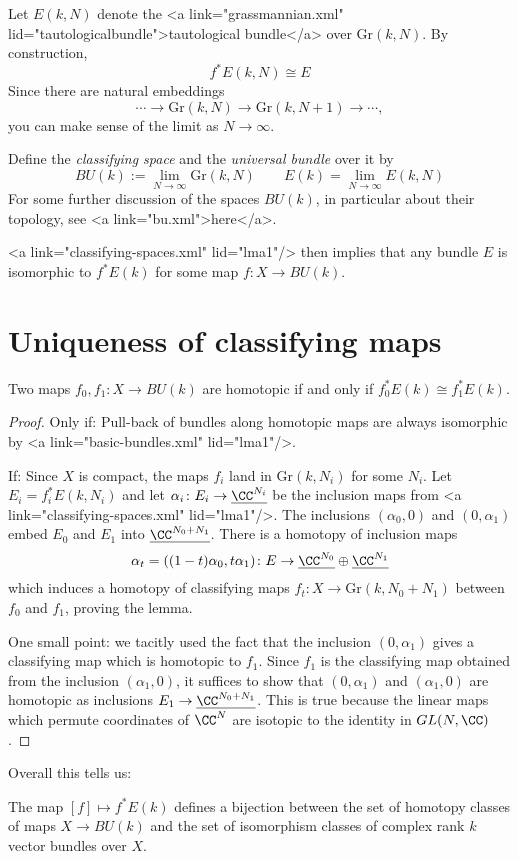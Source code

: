 Let $E(k,N)$ denote the <a link="grassmannian.xml" lid="tautologicalbundle">tautological bundle</a> over $\mathrm{Gr}(k,N)$. By construction,
\[f^*E(k,N)\cong E\]
Since there are natural embeddings
\[\cdots\to\mathrm{Gr}(k,N)\to\mathrm{Gr}(k,N+1)\to\cdots,\]
you can make sense of the limit as $N\to\infty$.
\begin{Definition}[dfn2]
Define the {\em classifying space} and the {\em universal bundle} over it by
\[BU(k):=\lim_{N\to\infty}\mathrm{Gr}(k,N)\qquad E(k)=\lim_{N\to\infty}E(k,N)\]
For some further discussion of the spaces $BU(k)$, in particular about their topology, see <a link="bu.xml">here</a>.
\end{Definition}
<a link="classifying-spaces.xml" lid="lma1"/> then implies that any bundle $E$ is isomorphic to $f^*E(k)$ for some map $f\colon X\to BU(k)$.

\section{Uniqueness of classifying maps}

\begin{Lemma}[lma2]
Two maps $f_0,f_1\colon X\to BU(k)$ are homotopic if and only if $f_0^*E(k)\cong f_1^*E(k)$.
\end{Lemma}
\begin{proof}
Only if: Pull-back of bundles along homotopic maps are always isomorphic by <a link="basic-bundles.xml" lid="lma1"/>.
 
If: Since $X$ is compact, the maps $f_i$ land in $\mathrm{Gr}(k,N_i)$ for some $N_i$. Let $E_i=f_i^*E(k,N_i)$ and let $\alpha_i\colon E_i\to \underline{\CC^{N_i}}$ be the inclusion maps from <a link="classifying-spaces.xml" lid="lma1"/>. The inclusions $(\alpha_0,0)$ and $(0,\alpha_1)$ embed $E_0$ and $E_1$ into $\underline{\CC^{N_0+N_1}}$. There is a homotopy of inclusion maps
\[\alpha_t=((1-t)\alpha_0,t\alpha_1)\colon E\to\underline{\CC^{N_0}}\oplus\underline{\CC^{N_1}}\]
which induces a homotopy of classifying maps $f_t\colon X\to\mathrm{Gr}(k,N_0+N_1)$ between $f_0$ and $f_1$, proving the lemma.
  
One small point: we tacitly used the fact that the inclusion $(0,\alpha_1)$ gives a classifying map which is homotopic to $f_1$. Since $f_1$ is the classifying map obtained from the inclusion $(\alpha_1,0)$, it suffices to show that $(0,\alpha_1)$ and $(\alpha_1,0)$ are homotopic as inclusions $E_1\to\underline{\CC^{N_0+N_1}}$. This is true because the linear maps which permute coordinates of $\CC^N$ are isotopic to the identity in $GL(N,\CC)$.
\end{proof}
Overall this tells us:
\begin{Theorem}
The map $[f]\mapsto f^*E(k)$ defines a bijection between the set of homotopy classes of maps $X\to BU(k)$ and the set of isomorphism classes of complex rank $k$ vector bundles over $X$.
\end{Theorem}

